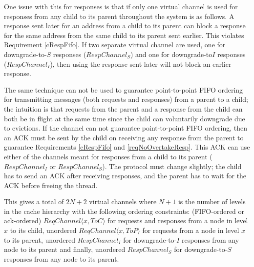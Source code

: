 One issue with this for responses is that if only one virtual channel is used
for responses from any child to its parent throughout the system is as follows.
A response sent later for an address from a child to its parent can block a
response for the same address from the same child to its parent sent earlier.
This violates Requirement \ref{cRespFifo}. If two separate virtual channel are
used, one for downgrade-to-$S$ responses ($RespChannel_S$) and one for
downgrade-to$I$ responses ($RespChannel_I$), then using the response sent later
will not block an earlier response.

The same technique can not be used to guarantee point-to-point FIFO ordering
for transmitting messages (both requests and responses) from a parent to a
child; the intuition is that requests from the parent and a response from the
child can both be in flight at the same time since the child can voluntarily
downgrade due to evictions.  If the channel can not guarantee point-to-point
FIFO ordering, then an ACK must be sent by the child on receiving any response
from the parent to guarantee Requirements \ref{cRespFifo} and
\ref{reqNoOvertakeResp}. This ACK can use either of the channels meant for
responses from a child to its parent ($RespChannel_I$ or $RespChannel_S$).  The
protocol must change slightly; the child has to send an ACK after receiving
responses, and the parent has to wait for the ACK before freeing the thread.

This gives a total of $2N + 2$ virtual channels where $N + 1$ is the number of
levels in the cache hierarchy with the following ordering constraints:
(FIFO-ordered or ack-ordered) $ReqChannel\langle x, ToC \rangle$ for requests and
responses from a node in level $x$ to its child, unordered $ReqChannel\langle x,
ToP \rangle$ for requests from a node in level $x$ to its parent, unordered
$RespChannel_I$ for downgrade-to-$I$ responses from any node to its parent and
finally, unordered $RespChannel_S$ for downgrade-to-$S$ responses from any node
to its parent.

